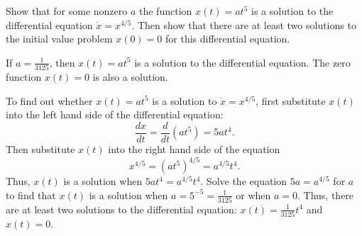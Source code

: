 \documentclass{ximera}
\begin{document}
\begin{exercise}  \label{c6.1.4A}
Show that for some nonzero $a$ the function $x(t)=at^5$ is a solution to the
differential equation $\dot{x}=x^{4/5}$.  Then show that there are at least
two solutions to the initial value problem $x(0)=0$ for this differential
equation.

\begin{solution}
\ans If $a = \frac{1}{3125}$, then $x(t) = at^5$ is a solution
to the differential equation.  The zero function $x(t) = 0$ is also a
solution.

\soln To find out whether $x(t) = at^5$ is a solution to
$\dot{x} = x^{4/5}$, first substitute $x(t)$ into the left hand side of
the differential equation:
\[
\frac{dx}{dt} = \frac{d}{dt}(at^5) = 5at^4.
\]
Then substitute $x(t)$ into the right hand side of the equation
\[
x^{4/5} = (at^5)^{4/5} = a^{4/5}t^4.
\]
Thus, $x(t)$ is a solution when $5at^4 = a^{4/5}t^4$.  Solve the equation
$5a = a^{4/5}$ for $a$ to find that $x(t)$ is a solution when $a = 5^{-5}
= \frac{1}{3125}$ or when $a = 0$.  Thus, there are at least two solutions
to the differential equation: $x(t) = \frac{1}{3125}t^4$ and $x(t) = 0$.


\end{solution}
\end{exercise}
\end{document}
